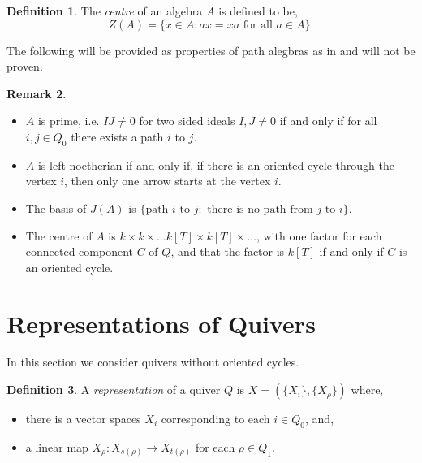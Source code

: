 \documentclass[11.5pt, twoside, a4paper, titlepage]{report}
\theoremstyle{definition}
\newtheorem{mydef}{Definition}[section]
\newtheorem{rem}[mydef]{Remark}
\theoremstyle{plain}
\begin{document}
\begin{mydef}
The \emph{centre} of an algebra $A$ is defined to be,
\begin{equation*}
Z(A)=\{x\in A: ax=xa \text{ for all } a\in A\}.
\end{equation*}
\end{mydef}

The following will be provided as properties of path alegbras as in \cite{CB2} and will not be proven.

\begin{rem}
\begin{itemize}
\item $A$ is prime, i.e. $IJ\neq 0$ for two sided ideals $I, J \neq 0$ if and only if for all $i, j \in Q_0$ there exists a path $i$ to $j$.
\item $A$ is left noetherian if and only if, if there is an oriented cycle through the vertex $i$, then only one arrow starts at the vertex $i$.
\item The basis of $J(A)$ is $\{\text{path } i \text{ to }j: \text{ there is no path from } j \text{ to }i\}$.
\item The centre of $A$ is $k\times k\times \dots k[T] \times k[T] \times \dots$, with one factor for each connected component $C$ of $Q$, and that the factor is $k[T]$ if and only if $C$ is an oriented cycle.
\end{itemize}
\end{rem}



\section{Representations of Quivers}

In this section we consider quivers without oriented cycles.

\begin{mydef}
A \emph{representation} of a quiver $Q$ is $X=(\{X_i\}, \{X_{\rho}\})$ where,
\begin{itemize}
\item there is a vector spaces $X_i$ corresponding to each $i\in Q_0$, and,
\item a linear map $X_{\rho}: X_{s(\rho)} \to X_{t(\rho)}$ for each $\rho \in Q_1$.
\end{itemize}
\end{mydef}
\end{document}
